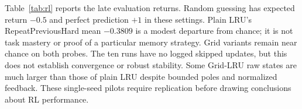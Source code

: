 \documentclass[letterpaper,twoside]{article}
\begin{document}


Table~\ref{tab:rl} reports the late evaluation returns. Random guessing has expected return $-0.5$ and perfect prediction $+1$ in these settings. Plain LRU's RepeatPreviousHard mean $-0.3809$ is a modest departure from chance; it is not task mastery or proof of a particular memory strategy. Grid variants remain near chance on both probes. The ten runs have no logged skipped updates, but this does not establish convergence or robust stability. Some Grid-LRU raw states are much larger than those of plain LRU despite bounded poles and normalized feedback. These single-seed pilots require replication before drawing conclusions about RL performance.

\clearpage

\end{document}
